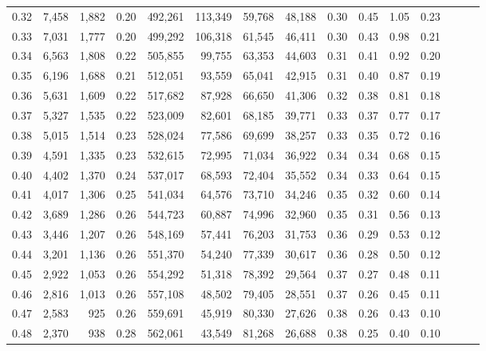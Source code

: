 \begin{tabular}{rrrrrrrrrrrrrrr}
0.32 &   7,458 &  1,882 &  0.20 &  492,261 &  113,349 &   59,768 &   48,188 &  0.30 &  0.45 &  1.05 &      0.23 \\
0.33 &   7,031 &  1,777 &  0.20 &  499,292 &  106,318 &   61,545 &   46,411 &  0.30 &  0.43 &  0.98 &      0.21 \\
0.34 &   6,563 &  1,808 &  0.22 &  505,855 &   99,755 &   63,353 &   44,603 &  0.31 &  0.41 &  0.92 &      0.20 \\
0.35 &   6,196 &  1,688 &  0.21 &  512,051 &   93,559 &   65,041 &   42,915 &  0.31 &  0.40 &  0.87 &      0.19 \\
0.36 &   5,631 &  1,609 &  0.22 &  517,682 &   87,928 &   66,650 &   41,306 &  0.32 &  0.38 &  0.81 &      0.18 \\
0.37 &   5,327 &  1,535 &  0.22 &  523,009 &   82,601 &   68,185 &   39,771 &  0.33 &  0.37 &  0.77 &      0.17 \\
0.38 &   5,015 &  1,514 &  0.23 &  528,024 &   77,586 &   69,699 &   38,257 &  0.33 &  0.35 &  0.72 &      0.16 \\
0.39 &   4,591 &  1,335 &  0.23 &  532,615 &   72,995 &   71,034 &   36,922 &  0.34 &  0.34 &  0.68 &      0.15 \\
0.40 &   4,402 &  1,370 &  0.24 &  537,017 &   68,593 &   72,404 &   35,552 &  0.34 &  0.33 &  0.64 &      0.15 \\
0.41 &   4,017 &  1,306 &  0.25 &  541,034 &   64,576 &   73,710 &   34,246 &  0.35 &  0.32 &  0.60 &      0.14 \\
0.42 &   3,689 &  1,286 &  0.26 &  544,723 &   60,887 &   74,996 &   32,960 &  0.35 &  0.31 &  0.56 &      0.13 \\
0.43 &   3,446 &  1,207 &  0.26 &  548,169 &   57,441 &   76,203 &   31,753 &  0.36 &  0.29 &  0.53 &      0.12 \\
0.44 &   3,201 &  1,136 &  0.26 &  551,370 &   54,240 &   77,339 &   30,617 &  0.36 &  0.28 &  0.50 &      0.12 \\
0.45 &   2,922 &  1,053 &  0.26 &  554,292 &   51,318 &   78,392 &   29,564 &  0.37 &  0.27 &  0.48 &      0.11 \\
0.46 &   2,816 &  1,013 &  0.26 &  557,108 &   48,502 &   79,405 &   28,551 &  0.37 &  0.26 &  0.45 &      0.11 \\
0.47 &   2,583 &    925 &  0.26 &  559,691 &   45,919 &   80,330 &   27,626 &  0.38 &  0.26 &  0.43 &      0.10 \\
0.48 &   2,370 &    938 &  0.28 &  562,061 &   43,549 &   81,268 &   26,688 &  0.38 &  0.25 &  0.40 &      0.10 \\

\end{tabular}
